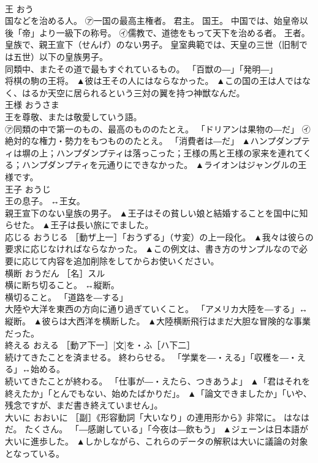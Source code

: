\documentclass[8pt]{extreport}
\begin{document}
\begin{CJK}{UTF8}{min}
\\	王	おう	
\\	国などを治める人。 ㋐一国の最高主権者。 君主。 国王。 中国では、始皇帝以後「帝」より一級下の称号。 ㋑儒教で、道徳をもって天下を治める者。 王者。 
\\	皇族で、親王宣下（せんげ）のない男子。 皇室典範では、天皇の三世（旧制では五世）以下の皇族男子。 
\\	同類中、またその道で最もすぐれているもの。 「百獣の―」「発明―」 
\\	将棋の駒の王将。	▲彼は王その人にはならなかった。 ▲この国の王は人ではなく、はるか天空に居られるという三対の翼を持つ神獣なんだ。
\\	王様	おうさま	
\\	王を尊敬、または敬愛していう語。 
\\	㋐同類の中で第一のもの、最高のもののたとえ。 「ドリアンは果物の―だ」 ㋑絶対的な権力・勢力をもつもののたとえ。 「消費者は―だ」	▲ハンプダンプティは塀の上；ハンプダンプティは落っこった；王様の馬と王様の家来を連れてくる；ハンプダンプティを元通りにできなかった。 ▲ライオンはジャングルの王様です。
\\	王子	おうじ	
\\	王の息子。 ↔王女。 
\\	親王宣下のない皇族の男子。	▲王子はその貧しい娘と結婚することを国中に知らせた。 ▲王子は長い旅にでました。
\\	応じる	おうじる	［動ザ上一］「おうずる」（サ変）の上一段化。	▲我々は彼らの要求に応じなければならなかった。 ▲この例文は、書き方のサンプルなので必要に応じて内容を追加削除をしてからお使いください。
\\	横断	おうだん	［名］スル 
\\	横に断ち切ること。 ↔縦断。 
\\	横切ること。 「道路を―する」 
\\	大陸や大洋を東西の方向に通り過ぎていくこと。 「アメリカ大陸を―する」↔縦断。	▲彼らは大西洋を横断した。 ▲大陸横断飛行はまだ大胆な冒険的な事業だった。
\\	終える	おえる	［動ア下一］[文]を・ふ［ハ下二］ 
\\	続けてきたことを済ませる。 終わらせる。 「学業を―・える」「収穫を―・える」↔始める。 
\\	続いてきたことが終わる。 「仕事が―・えたら、つきあうよ」	▲「君はそれを終えたか」「とんでもない、始めたばかりだ」。 ▲「論文できましたか」「いや、残念ですが、まだ書き終えていません」。
\\	大いに	おおいに	［副］《形容動詞「大いなり」の連用形から》非常に。 はなはだ。 たくさん。 「―感謝している」「今夜は―飲もう」	▲ジェーンは日本語が大いに進歩した。 ▲しかしながら、これらのデータの解釈は大いに議論の対象となっている。

\end{CJK}
\end{document}
